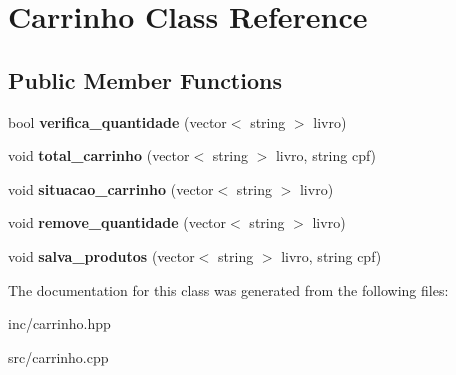 \hypertarget{class_carrinho}{}\section{Carrinho Class Reference}
\label{class_carrinho}
\subsection*{Public Member Functions}
\begin{DoxyCompactItemize}
\item 
\mbox{\label{class_carrinho_a485ede9af50b4d6f0ec09a733188c84f}} 
bool {\bfseries verifica\+\_\+quantidade} (vector$<$ string $>$ livro)
\item 
\mbox{\label{class_carrinho_ab9ac6c0fd232050fa9ff7a550cf1c775}} 
void {\bfseries total\+\_\+carrinho} (vector$<$ string $>$ livro, string cpf)
\item 
\mbox{\label{class_carrinho_a1425fb2e6c6d2c976cab8669c9086cc5}} 
void {\bfseries situacao\+\_\+carrinho} (vector$<$ string $>$ livro)
\item 
\mbox{\label{class_carrinho_ac0361c2825364a975486080e045d5f2a}} 
void {\bfseries remove\+\_\+quantidade} (vector$<$ string $>$ livro)
\item 
\mbox{\label{class_carrinho_ad50c097d0445c57ed4984bb70ce36b88}} 
void {\bfseries salva\+\_\+produtos} (vector$<$ string $>$ livro, string cpf)
\end{DoxyCompactItemize}


The documentation for this class was generated from the following files\+:\begin{DoxyCompactItemize}
\item 
inc/carrinho.\+hpp\item 
src/carrinho.\+cpp\end{DoxyCompactItemize}
